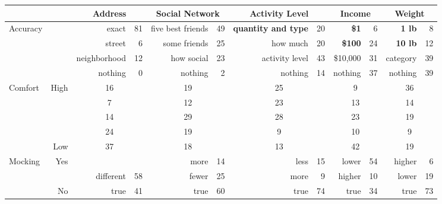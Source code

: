 
\begin{tabularx}{\textwidth}{Xr@{\hskip 0.15in}rr@{\hskip 0.15in}rr@{\hskip 0.15in}rr@{\hskip 0.15in}rr@{\hskip 0.15in}rr}
&&\multicolumn{2}{c}{\normalsize{\textbf{Address}}}&\multicolumn{2}{c}{\normalsize{\textbf{Social Network}}}&\multicolumn{2}{c}{\normalsize{\textbf{Activity Level}}}&\multicolumn{2}{c}{\normalsize{\textbf{Income}}}&\multicolumn{2}{c}{\normalsize{\textbf{Weight}}}\\ \toprule
\multirow{4}{*}{\normalsize{Accuracy}}& & exact & 81 & five best friends & 49 & \textbf{quantity and type} & 20 & \textbf{\$1} & 6 & \textbf{1 lb} & 8  \\
& & street & 6 & some friends & 25 & how much & 20 & \textbf{\$100} & 24 & \textbf{10 lb} & 12  \\
& & neighborhood & 12 & how social & 23 & activity level & 43 & \$10,000 & 31 & category & 39  \\
& & nothing & 0 & nothing & 2 & nothing & 14 & nothing & 37 & nothing & 39  \\ \midrule
\multirow{5}{*}{\normalsize{Comfort}} & High & \multicolumn{2}{c}{16} & \multicolumn{2}{c}{19} & \multicolumn{2}{c}{25} & \multicolumn{2}{c}{9} & \multicolumn{2}{c}{36}  \\
 &  & \multicolumn{2}{c}{7} & \multicolumn{2}{c}{12} & \multicolumn{2}{c}{23} & \multicolumn{2}{c}{13} & \multicolumn{2}{c}{14}  \\
 &  & \multicolumn{2}{c}{14} & \multicolumn{2}{c}{29} & \multicolumn{2}{c}{28} & \multicolumn{2}{c}{23} & \multicolumn{2}{c}{19}  \\
 &  & \multicolumn{2}{c}{24} & \multicolumn{2}{c}{19} & \multicolumn{2}{c}{9} & \multicolumn{2}{c}{10} & \multicolumn{2}{c}{9}  \\
 & Low & \multicolumn{2}{c}{37} & \multicolumn{2}{c}{18} & \multicolumn{2}{c}{13} & \multicolumn{2}{c}{42} & \multicolumn{2}{c}{19}  \\ \midrule
\multirow{3}{*}{\normalsize{Mocking}} & \multirow{2}{*}{\normalsize{Yes}} &  &  & more & 14 & less & 15 & lower & 54 & higher & 6  \\
 &  & different & 58 & fewer & 25 & more & 9 & higher & 10 & lower & 19  \\
 & \normalsize{No} & true & 41 & true & 60 & true & 74 & true & 34 & true & 73  \\ \midrule

\end{tabularx}

